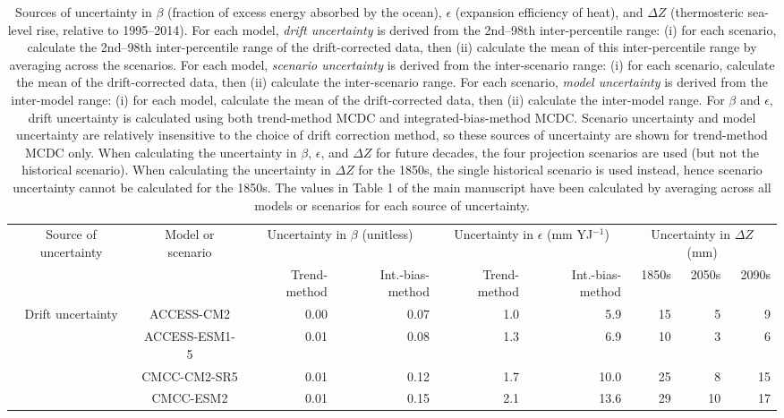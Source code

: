 \begin{table*}[t]
\centering
\caption{Sources of uncertainty in $\beta$ (fraction of excess energy absorbed by the ocean), $\epsilon$ (expansion efficiency of heat), and ${\Delta}Z$ (thermosteric sea-level rise, relative to 1995--2014). For each model, \emph{drift uncertainty} is derived from the 2nd--98th inter-percentile range: (i) for each scenario, calculate the 2nd--98th inter-percentile range of the drift-corrected data, then (ii) calculate the mean of this inter-percentile range by averaging across the scenarios. For each model, \emph{scenario uncertainty} is derived from the inter-scenario range: (i) for each scenario, calculate the mean of the drift-corrected data, then (ii) calculate the inter-scenario range. For each scenario, \emph{model uncertainty} is derived from the inter-model range: (i) for each model, calculate the mean of the drift-corrected data, then (ii) calculate the inter-model range. For $\beta$ and $\epsilon$, drift uncertainty is calculated using both trend-method MCDC and integrated-bias-method MCDC. Scenario uncertainty and model uncertainty are relatively insensitive to the choice of drift correction method, so these sources of uncertainty are shown for trend-method MCDC only. When calculating the uncertainty in $\beta$, $\epsilon$, and ${\Delta}Z$ for future decades, the four projection scenarios are used (but not the historical scenario). When calculating the uncertainty in ${\Delta}Z$ for the 1850s, the single historical scenario is used instead, hence scenario uncertainty cannot be calculated for the 1850s. The values in Table 1 of the main manuscript have been calculated by averaging across all models or scenarios for each source of uncertainty.}
\begin{tabular}{c|c|rr|rr|rrr}
\toprule
Source of uncertainty & Model or scenario & \multicolumn{2}{c|}{Uncertainty in $\beta$ (unitless)} & \multicolumn{2}{c|}{Uncertainty in $\epsilon$ (mm YJ$^{-1}$)} & \multicolumn{3}{c}{Uncertainty in ${\Delta}Z$ (mm)} \\
 &  & Trend-method & Int.-bias-method & Trend-method & Int.-bias-method & 1850s & 2050s & 2090s \\
\midrule
\multirow[c]{16}{*}{Drift uncertainty} & ACCESS-CM2 & 0.00 & 0.07 & 1.0 & 5.9 & 15 & 5 & 9 \\
 & ACCESS-ESM1-5 & 0.01 & 0.08 & 1.3 & 6.9 & 10 & 3 & 6 \\
 & CMCC-CM2-SR5 & 0.01 & 0.12 & 1.7 & 10.0 & 25 & 8 & 15 \\
 & CMCC-ESM2 & 0.01 & 0.15 & 2.1 & 13.6 & 29 & 10 & 17 \\

\end{tabular}
\end{table*}
